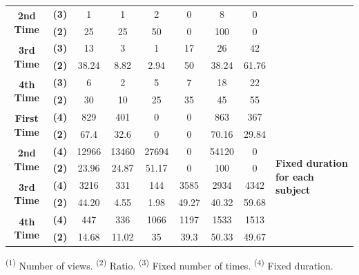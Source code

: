 \begin{sidewaystableorg}
{\begin{tabular}{|c|c|c|c|c|c|c|c|p{3cm}|}
         \multirow{2}{*}{\textbf{2nd Time}} & \textbf{(3)} & 1 & 1 & 2 & 0 & 8 & 0 & \\ \cline{2-8}
         & \textbf{(2)} & 25 & 25 & 50 & 0 & 100 & 0 & \\ \cline{1-8}
         
         \multirow{2}{*}{\textbf{3rd Time}}& \textbf{(3)} & 13 & 3 & 1 & 17 & 26 & 42 & \\ \cline{2-8}
         & \textbf{(2)} & 38.24 & 8.82 & 2.94 & 50 & 38.24 & 61.76 & \\  \cline{1-8}
         
         \multirow{2}{*}{\textbf{4th Time}}& \textbf{(3)} & 6 & 2 & 5 & 7 & 18 & 22 & \\  \cline{2-8}
         & \textbf{(2)} & 30 & 10 & 25 & 35 & 45 & 55 & \\  \hline
         
         \multirow{2}{*}{\textbf{First Time}}& \textbf{(4)} & 829 & 401 & 0 & 0 & 863 & 367 & \multirow{8}{*}{\parbox{3cm}{\textbf{Fixed duration for each subject}}}\\  \cline{2-8}
         
         & \textbf{(2)} & 67.4 & 32.6 & 0 & 0 & 70.16 & 29.84 & \\  \cline{1-8}
         \multirow{2}{*}{\textbf{2nd Time}}& \textbf{(4)} & 12966 & 13460 & 27694 & 0 & 54120 & 0 & \\  \cline{2-8}
         & \textbf{(2)} & 23.96 & 24.87 & 51.17 & 0 & 100 & 0 & \\  \cline{1-8}
         \multirow{2}{*}{\textbf{3rd Time}}& \textbf{(4)} & 3216 & 331 & 144 & 3585 & 2934 & 4342 & \\  \cline{2-8}
         & \textbf{(2)} & 44.20 & 4.55 & 1.98 & 49.27 & 40.32 & 59.68 & \\  \cline{1-8}
         \multirow{2}{*}{\textbf{4th Time}} & \textbf{(4)} & 447 & 336 & 1066 & 1197 & 1533 & 1513 & \\  \cline{2-8}
         & \textbf{(2)} & 14.68 & 11.02 & 35 & 39.3 & 50.33 & 49.67 & \\ \hline
    \end{tabular}}
    \label{tb5}
    
    \vspace{2mm}
    \begin{flushleft}
    \footnotesize
    \textsuperscript{(1)} Number of views. \hspace{5mm}
    \textsuperscript{(2)} Ratio. \hspace{5mm}
    \textsuperscript{(3)} Fixed number of times. \hspace{5mm}
    \textsuperscript{(4)} Fixed duration. \hspace{5mm}
    \end{flushleft}
    
\end{sidewaystableorg}